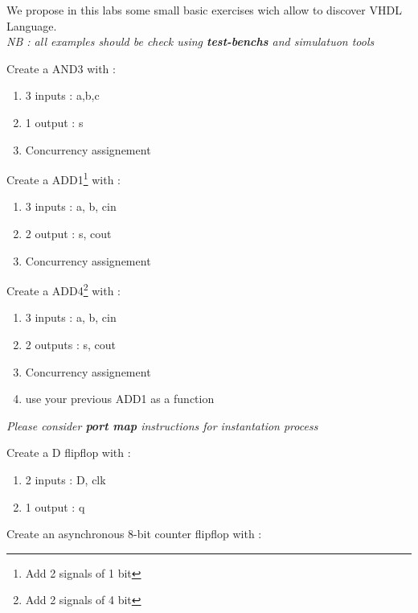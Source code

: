 \documentclass[12pt]{tdtp}
\begin{document}
\titre
We propose in this labs some small basic exercises wich allow to discover VHDL Language.\\

\textit {NB : all examples should be check using \textbf{test-benchs} and simulatuon tools}


\Exo

Create a AND3 with :

\begin{enumerate}
	\item 3 inputs : a,b,c
	\item 1 output : s
	\item Concurrency assignement 
\end{enumerate}


\Exo

Create a ADD1\footnote{Add 2 signals of 1 bit} with :

\begin{enumerate}
	\item 3 inputs : a, b, cin
	\item 2 output : s, cout
	\item Concurrency assignement 
\end{enumerate}


\Exo 

Create a ADD4\footnote{Add 2 signals of 4 bit} with : 

\begin{enumerate}
	\item 3 inputs : a, b, cin
	\item 2 outputs : s, cout
	\item Concurrency assignement 
	\item use your previous ADD1 as a function
\end{enumerate}

\textit{Please consider \textbf{port map} instructions for instantation process}

\Exo


Create a D flipflop  with : 

\begin{enumerate}
	\item 2 inputs : D, clk
	\item 1 output : q
\end{enumerate}

\Exo


Create an asynchronous 8-bit counter flipflop  with : 
\end{document}
